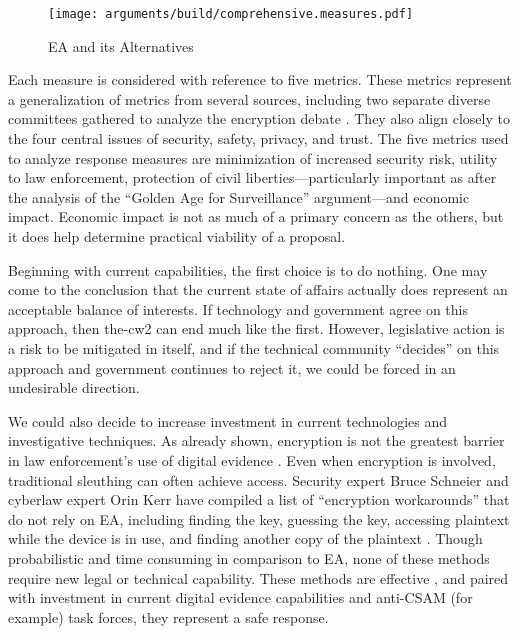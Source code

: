 \begin{sidewaysfigure}
  \centering\CaptionFontSize
  \texttt{[image: arguments/build/comprehensive.measures.pdf]}
  \caption{EA and its Alternatives}
  \label{fig-arg-measures}
\end{sidewaysfigure}

Each measure is considered with reference to five metrics. These metrics represent a generalization of metrics from
several sources, including two separate diverse committees gathered to analyze the encryption debate
\cite{committee_decrypting_2018} \cite{group_2019} \cite{varia_2018}. They also align closely to the four central issues
of security, safety, privacy, and trust. The five metrics used to analyze response measures are minimization of
increased security risk, utility to law enforcement, protection of civil liberties---particularly important as after the
analysis of the ``Golden Age for Surveillance'' argument---and economic impact. Economic impact is not as much of a
primary concern as the others, but it does help determine practical viability of a proposal.

Beginning with current capabilities, the first choice is to do nothing. One may come to the conclusion that the current
state of affairs actually does represent an acceptable balance of interests. If technology and government agree on this
approach, then \ac{the-cw2} can end much like the first. However, legislative action is a risk to be mitigated in
itself, and if the technical community ``decides'' on this approach and government continues to reject it, we could be
forced in an undesirable direction.

We could also decide to increase investment in current technologies and investigative techniques. As already shown,
encryption is not the greatest barrier in law enforcement's use of digital evidence \cite{carter_2018}. Even when
encryption is involved, traditional sleuthing can often achieve access. Security expert Bruce Schneier and cyberlaw
expert Orin Kerr have compiled a list of ``encryption workarounds'' that do not rely on \ac{EA}, including finding the
key, guessing the key, accessing plaintext while the device is in use, and finding another copy of the plaintext
\cite{kerr_encryption_2017}. Though probabilistic and time consuming in comparison to \ac{EA}, none of these methods
require new legal or technical capability. These methods are effective \cite{greenberg_2018}, and paired with investment
in current digital evidence capabilities and anti-\ac{CSAM} (for example) task forces, they represent a safe response.

